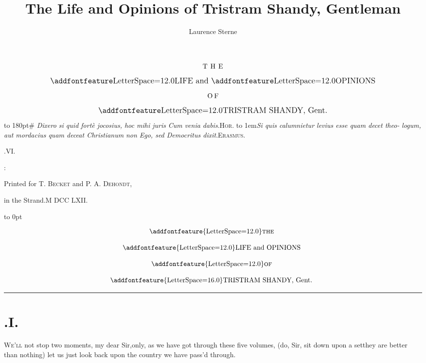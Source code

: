 \documentclass{article}
\title{The Life and Opinions of Tristram Shandy, Gentleman}
\author{Laurence Sterne}
\begin{document}
\pagestyle{empty}
\null
\vfill
$$\vbox{\openup 10pt\halign{\hss #\hss\cr
\hbox to 3em{T H E}\cr
\large \ls{LIFE} and \ls{OPINIONS}\cr
\hbox to 1.6em{O F}\cr
\large \ls{TRISTRAM SHANDY}, Gent.\cr
}}$$
\vfill
\newpage
\null
\newpage %
\vbox{\openup 10pt}
\vfill
\vbox{\openup -2pt\halign to 180pt{\footnotesize #\cr
\textit{Dixero si quid fortè jocosius, hoc mihi juris}\hfill\cr
\textit{Cum venia dabis}.\tsh \hfill \textsc{Hor.}\cr
\noalign{\vskip 4pt}
\hbox to 1em{\tsk}\textit{Si quis calumnietur levius esse quam decet theo-}\cr
\quad\textit{logum, aut mordacius quam deceat Christianum}\cr
\quad\textit{\tsk non Ego, sed Democritus dixit}.\tsk\hfill\textsc{Erasmus}.\cr}}
\vfill
\centerline{.\quad VI.}
\vfill
\centerline{:}
\centerline{\small Printed for T. \textsc{Becket} and P. A. \textsc{Dehondt},}
\centerline{\small in the Strand.\quad M DCC LXII.}

\newpage
\null
\newpage
\pagestyle{fancy}
\thispagestyle{empty}
\setcounter{page}{1}
\hbox{}\vskip -36pt
\moveright 88pt\vbox to 0pt{\hsize
40pt\vss}

\[\vbox{\openup 12pt\halign{\hss # \hss\cr
\addfontfeature{LetterSpace=12.0}\textsc{the}\cr
\addfontfeature{LetterSpace=12.0}LIFE and OPINIONS\cr
\addfontfeature{LetterSpace=12.0}\textsc{of}\cr
{\addfontfeature{LetterSpace=16.0}TRISTRAM SHANDY}, Gent.\cr}}\]

\vskip 12pt
\hrule

\bigskip
\setlength{\baselineskip}{14pt}  %
\sloppy

\section{.\enspace I.}

\lettrine{\Tsk W}{e’ll} not stop two moments, my dear Sir,\tsk only, as we have got through
these five volumes, (do, Sir, sit down upon a set\tsh they are better than nothing)
let us just look back upon the country we have pass’d through.\tsh
\end{document}
